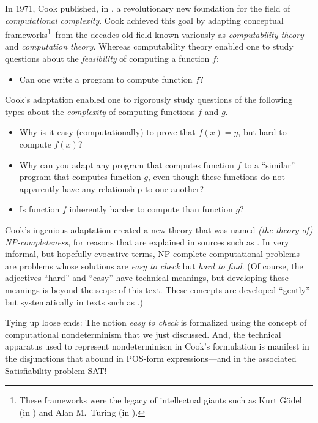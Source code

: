 \medskip

In 1971, Cook published, in \cite{Cook71}, a revolutionary new
foundation for the field of {\it computational complexity}.
 Cook achieved this goal by adapting
conceptual frameworks\footnote{These frameworks were the legacy of
  intellectual giants such as Kurt G\"{o}del 
  (in \cite{Goedel31}) and Alan M.~Turing  (in
  \cite{Turing36}).}~from the decades-old field known variously as
{\it computability theory}  and {\it
  computation theory}. 
Whereas computability theory enabled one to study questions about the
{\em feasibility} of computing a function $f$:
\begin{itemize}
\item
Can one write a program to compute function $f$?
\end{itemize}
Cook's adaptation enabled one to rigorously study questions of the
following types about the {\em complexity} of computing functions $f$
and $g$.
\begin{itemize}
\item
Why is it easy (computationally) to prove that $f(x) = y$, but hard to
compute $f(x)$?
\item
Why can you adapt any program that computes function $f$ to a
``similar'' program that computes function $g$, even though these
functions do not apparently have any relationship to one another?
\item
Is function $f$ inherently harder to compute than function $g$?
\end{itemize}
Cook's ingenious adaptation created a new theory that was named {\it
  (the theory of) {\sf NP}-completeness}, 
 for reasons that are
explained in sources such as \cite{GareyJ79}.  In very informal, but
hopefully evocative terms, {\sf NP}-complete computational problems
are problems whose solutions are {\em easy to check} but {\em hard to
  find}.  (Of course, the adjectives ``hard'' and ``easy'' have
technical meanings, but developing these meanings is beyond the scope
of this text.  These concepts are developed ``gently'' but
systematically in texts such as \cite{Rosenberg09}.)

Tying up loose ends: The notion {\em easy to check} is formalized
using the concept of computational nondeterminism that we just
discussed.  And, the technical apparatus used to represent
nondeterminism in Cook's formulation is manifest in the disjunctions
that abound in POS-form expressions---and in the associated
Satisfiability problem {\sf SAT}!


